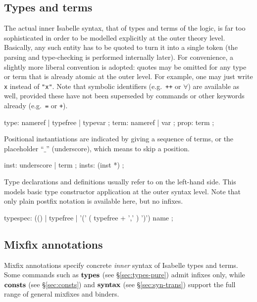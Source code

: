 \subsection{Types and terms}\label{sec:types-terms}

The actual inner Isabelle syntax, that of types and terms of the logic, is far
too sophisticated in order to be modelled explicitly at the outer theory
level.  Basically, any such entity has to be quoted to turn it into a single
token (the parsing and type-checking is performed internally later).  For
convenience, a slightly more liberal convention is adopted: quotes may be
omitted for any type or term that is already atomic at the outer level.  For
example, one may just write \texttt{x} instead of \texttt{"x"}.  Note that
symbolic identifiers (e.g.\ \texttt{++} or $\forall$) are available as well,
provided these have not been superseded by commands or other keywords already
(e.g.\ \texttt{=} or \texttt{+}).

\begin{rail}
  type: nameref | typefree | typevar
  ;
  term: nameref | var
  ;
  prop: term
  ;
\end{rail}

Positional instantiations are indicated by giving a sequence of terms, or the
placeholder ``$\_$'' (underscore), which means to skip a position.

\begin{rail}
  inst: underscore | term
  ;
  insts: (inst *)
  ;
\end{rail}

Type declarations and definitions usually refer to  on
the left-hand side.  This models basic type constructor application at the
outer syntax level.  Note that only plain postfix notation is available here,
but no infixes.

\begin{rail}
  typespec: (() | typefree | '(' ( typefree + ',' ) ')') name
  ;
\end{rail}


\subsection{Mixfix annotations}

Mixfix annotations specify concrete \emph{inner} syntax of Isabelle types and
terms.  Some commands such as ${\mathord{\mathbf{types}}}$ (see \S\ref{sec:types-pure}) admit
infixes only, while ${\mathord{\mathbf{consts}}}$ (see \S\ref{sec:consts}) and
${\mathord{\mathbf{syntax}}}$ (see \S\ref{sec:syn-trans}) support the full range of
general mixfixes and binders.

